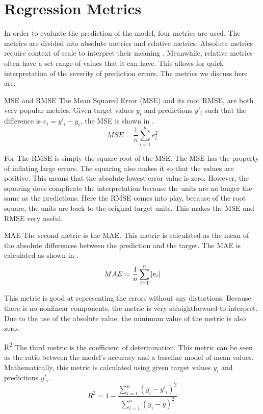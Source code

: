 \section{Regression Metrics}\label{sec:evaluation_metrics}
\noindent In order to evaluate the prediction of the model, four metrics are used. The metrics are divided into absolute metrics and relative metrics. Absolute metrics require context of scale to interpret their meaning \autocite{botchkarevNewTypologyDesign2019,alpaydinIntroductionMachineLearning2020}. Meanwhile, relative metrics often have a set range of values that it can have. This allows for quick interpretation of the severity of prediction errors. The metrics we discuss here are:
\begin{numdesc}
  \item[MSE and RMSE]
  The Mean Squared Error (MSE) and its root RMSE, are both very popular metrics. Given target values \(y_i\) and predictions \(y'_i\) such that the difference is \(e_{i} = y'_i-y_i\), the MSE is shown in .
  \begin{equation}
    MSE = \frac{1}{n}\sum_{i=1}^{n}e_{i}^{2}\label{eq:mse}
  \end{equation}

  For The RMSE is simply the square root of the MSE\@. The MSE has the property of inflating large errors. The squaring also makes it so that the values are positive. This means that the absolute lowest error value is zero. However, the squaring does complicate the interpretation because the units are no longer the same as the predictions. Here the RMSE comes into play, because of the root square, the units are back to the original target units. This makes the MSE and RMSE very useful.
  \item[MAE]
  The second metric is the MAE\@. This metric is calculated as the mean of the absolute differences between the prediction and the target. The MAE is calculated as shown in .
  \begin{equation}
    MAE = \frac{1}{n}\sum_{i=1}^{n}\abs{e_{i}}\label{eq:mae}
  \end{equation}

  This metric is good at representing the errors without any distortions. Because there is no nonlinear components, the metric is very straightforward to interpret. Due to the use of the absolute value, the minimum value of the metric is also zero.
  \item[R\textsuperscript{2}]
  The third metric is the coefficient of determination. This metric can be seen as the ratio between the model's accuracy and a baseline model of mean values. Mathematically, this metric is calculated using  given target values \(y_i\) and predictions \(y'_i\).
  \begin{equation}
    {R}^{2} = 1 - \frac{\sum_{i=1}^{n}{(y_{i} - y'_{i})}^{2}}{\sum_{i=1}^{n}{(y_{i} - \bar{y})}^{2}}\label{eq:r2}
  \end{equation}


\end{numdesc}
